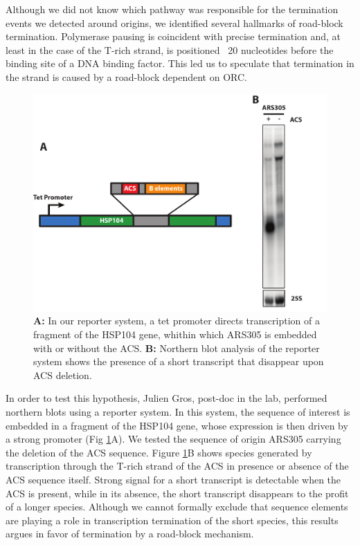 Although we did not know which pathway was responsible for the termination events we detected around origins, we identified several hallmarks of road-block termination. Polymerase pausing is coincident with precise termination and, at least in the case of the T-rich strand, is positioned ~20 nucleotides before the binding site of a DNA binding factor. This led us to speculate that termination in the  strand is caused by a road-block dependent on ORC. 

\begin{figure}[h]

\centering
\includegraphics[width=\textwidth]{figures/results/northern}
\caption[Northern blot analysis of transcription through ARS305]{\textbf{A: }In our reporter system, a tet promoter directs transcription of a fragment of the HSP104 gene, whithin which ARS305 is embedded with or without the ACS. \textbf{B: } Northern blot analysis of the reporter system shows the presence of a short transcript that disappear upon ACS deletion. }
\label{fig:northern}

\end{figure}  

In order to test this hypothesis, Julien Gros, post-doc in the lab, performed northern blots using a reporter system. In this system, the sequence of interest is embedded in a fragment of the HSP104 gene, whose expression is then driven by a strong promoter (Fig \ref{fig:northern}A). 
We tested the sequence of origin ARS305 carrying the deletion of the ACS sequence. 
Figure \ref{fig:northern}B shows species generated by transcription through the T-rich strand of the ACS in presence or absence of the ACS sequence itself. 
Strong signal for a short transcript is detectable when the ACS is present, while in its absence, the short transcript disappears to the profit of a longer species. 
Although we cannot formally exclude that sequence elements are playing a role in transcription termination of the short species, this results argues in favor of termination by a road-block mechanism.

